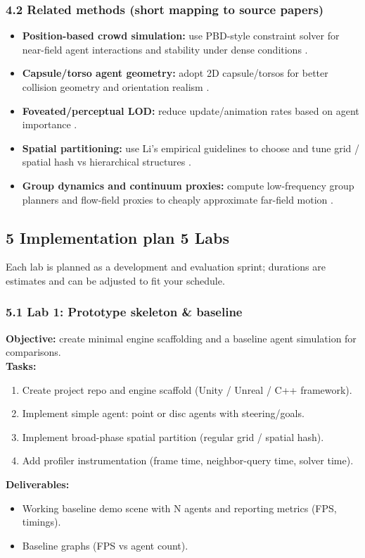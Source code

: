 \subsubsection{4.2 Related methods (short mapping to source papers)}
\begin{itemize}[itemsep=0pt]
  \item \textbf{Position-based crowd simulation:} use PBD-style constraint solver for near-field agent interactions and stability under dense conditions \cite{WEISS201912,WeissImp2019}. 
  \item \textbf{Capsule/torso agent geometry:} adopt 2D capsule/torsos for better collision geometry and orientation realism \cite{Talukdar2025}.
  \item \textbf{Foveated/perceptual LOD:} reduce update/animation rates based on agent importance \cite{Stancu2025}.
  \item \textbf{Spatial partitioning:} use Li's empirical guidelines to choose and tune grid / spatial hash vs hierarchical structures \cite{Bo2014}.
  \item \textbf{Group dynamics and continuum proxies:} compute low-frequency group planners and flow-field proxies to cheaply approximate far-field motion \cite{Saeed2022}.
\end{itemize}

\subsection{5 Implementation plan 5 Labs}
Each lab is planned as a development and evaluation sprint; durations are estimates and can be adjusted to fit your schedule.

\subsubsection*{5.1 Lab 1: Prototype skeleton \& baseline}
\textbf{Objective:} create minimal engine scaffolding and a baseline agent simulation for comparisons.\\
\textbf{Tasks:}
\begin{enumerate}[itemsep=0pt]
  \item Create project repo and engine scaffold (Unity / Unreal / C++ framework).
  \item Implement simple agent: point or disc agents with steering/goals.
  \item Implement broad-phase spatial partition (regular grid / spatial hash).
  \item Add profiler instrumentation (frame time, neighbor-query time, solver time).
\end{enumerate}
\textbf{Deliverables:}
\begin{itemize}[itemsep=0pt]
  \item Working baseline demo scene with N agents and reporting metrics (FPS, timings).
  \item Baseline graphs (FPS vs agent count).
\end{itemize}

